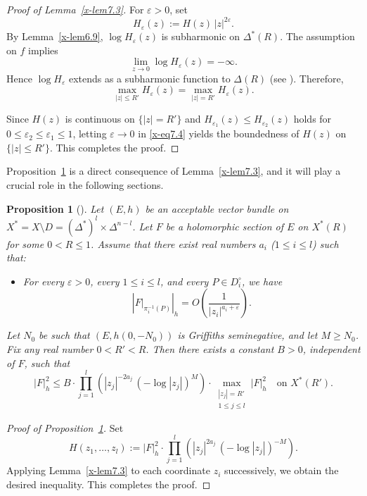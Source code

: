 \documentclass[12pt,twoside]{amsart}
\newtheorem{prop}[thm]{Proposition}
\theoremstyle{definition}
\begin{document}
\begin{proof}[Proof of Lemma~\ref{x-lem7.3}]
For $\varepsilon > 0$, set 
\[
H_\varepsilon(z) := H(z)\, |z|^{2\varepsilon}.
\]
By Lemma~\ref{x-lem6.9}, $\log H_\varepsilon(z)$ is subharmonic on 
$\Delta^*(R)$.  
The assumption on $f$ implies 
\[
\lim_{z\to 0} \log H_\varepsilon(z) = -\infty.
\]
Hence $\log H_\varepsilon$ extends as a subharmonic function to $\Delta(R)$
(see \cite[(3.3.25) Theorem]{noguchi-ochiai}).  
Therefore,
\begin{equation}\label{x-eq7.4}
\max_{|z|\le R'} H_\varepsilon(z)
=
\max_{|z|=R'} H_\varepsilon(z).
\end{equation}

Since $H(z)$ is continuous on $\{ |z|=R'\}$ and 
$H_{\varepsilon_1}(z) \le H_{\varepsilon_2}(z)$ holds for 
$0 \le \varepsilon_2 \le \varepsilon_1 \le 1$,  
letting $\varepsilon\to 0$ in \eqref{x-eq7.4} yields the boundedness of $H(z)$ 
on $\{|z|\le R'\}$.  
This completes the proof.
\end{proof}

Proposition~\ref{x-prop7.4} is a direct consequence of 
Lemma~\ref{x-lem7.3}, and it will play a crucial role in the following sections.

\begin{prop}[{\cite[Proposition~21.2.8]{mochizuki4}}]\label{x-prop7.4}
Let $(E,h)$ be an acceptable vector bundle 
on $X^* = X \setminus D=(\Delta^*)^l\times \Delta^{n-l}$.  
Let $F$ be a holomorphic section of $E$ on $X^*(R)$ for some $0 < R \le 1$.  
Assume that there exist real numbers $a_i$ {\em{(}}$1 \le i \le l${\em{)}} such that:

\begin{itemize}
\item 
For every $\varepsilon > 0$, every $1 \le i \le l$, and every 
$P \in D_i^\circ$, we have
\[
\left|F|_{\pi_i^{-1}(P)}\right|_h
= O\!\left(\frac{1}{|z_i|^{a_i +\varepsilon}}\right).
\]
\end{itemize}

Let $N_0$ be such that $(E, h(0,-N_0))$ is Griffiths seminegative, 
and let $M \ge N_0$.  
Fix any real number $0 < R' < R$.  
Then there exists a constant $B > 0$, independent of $F$, such that
\[
|F|_h^2
\le 
B \cdot 
\prod_{j=1}^l \left( |z_j|^{-2a_j} \, (-\log |z_j|)^M \right)
\cdot 
\max_{\substack{|z_j| = R' \\ 1 \le j \le l}} |F|_h^2
\quad \text{on } X^*(R').
\]
\end{prop}

\begin{proof}[Proof of Proposition~\ref{x-prop7.4}]
Set
\[
H(z_1,\ldots,z_l)
:= 
|F|_h^2 \cdot 
\prod_{j=1}^l 
\left( |z_j|^{2a_j} \, (-\log |z_j|)^{-M} \right).
\]
Applying Lemma~\ref{x-lem7.3} to each coordinate $z_i$ successively, 
we obtain the desired inequality.  
This completes the proof.
\end{proof}
\end{document}
